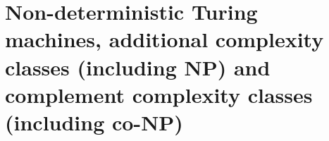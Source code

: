 
\chapter{Non-deterministic Turing machines, additional complexity classes (including NP) and complement complexity classes (including co-NP)}

